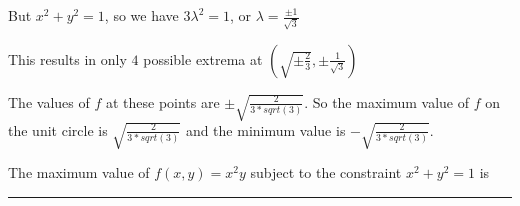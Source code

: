 \documentclass{ximera}
\begin{document}
\begin{question}
\begin{solution}
\begin{hint}
			But $x^2+y^2=1$, so we have $3\lambda^2 = 1$, or $\lambda =\frac{\pm 1}{\sqrt{3}}$
		\end{hint}
		\begin{hint}	
			This results in only $4$ possible extrema at $(\sqrt{\pm \frac{2}{3}}, \pm \frac{1}{\sqrt{3}})$
		\end{hint}
		\begin{hint}
			The values of $f$ at these points are $\pm \sqrt{\frac{2}{3*sqrt(3)}}$.  So the maximum value of $f$ on the unit circle 
			is $\sqrt{\frac{2}{3*sqrt(3)}}$ and the minimum value is $-\sqrt{\frac{2}{3*sqrt(3)}}$. 
		\end{hint}
		The maximum value of $f(x,y) = x^2y$ subject to the constraint $x^2+y^2=1$ is 
		\end{solution}
	\end{question}

	\hrule
\end{document}
